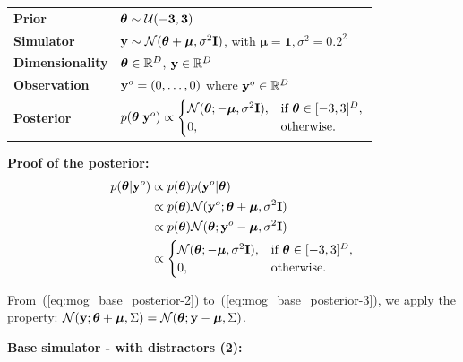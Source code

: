 \begin{tabular}{@{}ll@{}}
  \textbf{Prior} & $\boldsymbol{\theta} \sim \mathcal{U}(-\mathbf{3}, \mathbf{3})$ \\ [5pt]
  \textbf{Simulator} & $\mathbf{y} \sim \mathcal{N}(\boldsymbol{\theta} + \boldsymbol{\mu}, \sigma^2 \mathbf{I}) \label{eq:mog_base}$, with $\boldsymbol{\mu} = \mathbf{1}, \sigma^2 = 0.2^2$ \\ [5pt]
  \textbf{Dimensionality} & $\boldsymbol{\theta} \in \mathbb{R}^{D}$, $\mathbf{y} \in \mathbb{R}^{D}$ \\ [5pt]
  \textbf{Observation} & $\mathbf{y}^o = (0, \ldots, 0)$ where $\mathbf{y}^o \in \mathbb{R}^D$ \\ [5pt]
  \textbf{Posterior} & $ p(\boldsymbol{\theta} | \mathbf{y}^o) \propto
                                    \begin{cases}
                                      \mathcal{N}(\boldsymbol{\theta}; -\boldsymbol{\mu}, \sigma^2 \mathbf{I}), & \text{if } \boldsymbol{\theta} \in [-3, 3]^D, \\
                                      0, & \text{otherwise}.
                                    \end{cases} $ \\ [5pt]
\end{tabular}

\textbf{Proof of the posterior:}
%
\begin{align}
  p(\boldsymbol{\theta} | \mathbf{y}^o) &\propto p(\boldsymbol{\theta}) p(\mathbf{y}^o | \boldsymbol{\theta}) \label{eq:mog_base_posterior-1} \\
                  &\propto p(\boldsymbol{\theta}) \mathcal{N}(\mathbf{y}^o; \boldsymbol{\theta} + \boldsymbol{\mu}, \sigma^2 \mathbf{I}) \label{eq:mog_base_posterior-2} \\
                  &\propto p(\boldsymbol{\theta}) \mathcal{N}(\boldsymbol{\theta}; \mathbf{y}^o - \boldsymbol{\mu}, \sigma^2 \mathbf{I}) \label{eq:mog_base_posterior-3} \\
                  &\propto
                    \begin{cases}
                      \mathcal{N}(\boldsymbol{\theta}; - \boldsymbol{\mu}, \sigma^2 \mathbf{I}), & \text{if } \boldsymbol{\theta} \in [-3, 3]^D, \\
                      0, & \text{otherwise}.
                    \end{cases} \label{eq:mog_base_posterior}
\end{align}

From~(\ref{eq:mog_base_posterior-2}) to~(\ref{eq:mog_base_posterior-3}), we apply the property: $\mathcal{N}(\mathbf{y}; \boldsymbol{\theta} + \boldsymbol{\mu}, \Sigma) = \mathcal{N}(\boldsymbol{\theta}; \mathbf{y} - \boldsymbol{\mu} , \Sigma)$.


\textbf{Base simulator - with distractors (2):}

